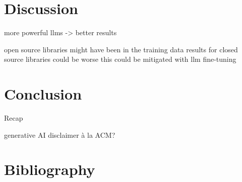 \documentclass[
  a4paper,
  DIV=11,
  numbers=noendperiod]{scrreprt}
\theoremstyle{definition}
\theoremstyle{remark}
\begin{document}

\chapter{Discussion}\label{discussion}

more powerful llms -\textgreater{} better results

open source libraries might have been in the training data results for
closed source libraries could be worse this could be mitigated with llm
fine-tuning


\chapter{Conclusion}\label{conclusion}

Recap

generative AI disclaimer à la ACM?


\chapter*{Bibliography}\label{bibliography}


\printbibliography[heading=none]
\end{document}
